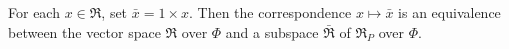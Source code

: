 For each $x \in \mathfrak{R}$, set $\bar{x} = 1 \times x$. Then the correspondence $x \mapsto \bar{x}$ is an equivalence between the vector space $\mathfrak{R}$ over $\Phi$ and a subspace $\bar{\mathfrak{R}}$ of $\mathfrak{R}_P$ over $\Phi$.
